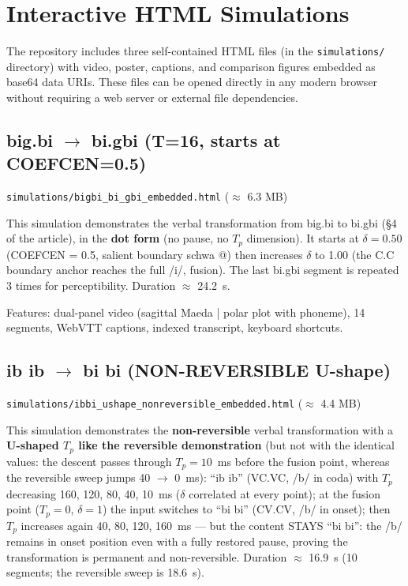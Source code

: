 \documentclass[11pt,a4paper]{article}
\begin{document}
\section{Interactive HTML Simulations}

The repository includes three self-contained HTML files (in the
\texttt{simulations/} directory) with video, poster, captions, and
comparison figures embedded as base64 data URIs. These files can be
opened directly in any modern browser without requiring a web server
or external file dependencies.

\subsection{big.bi $\to$ bi.gbi (T=16, starts at COEFCEN=0.5)}

\texttt{simulations/bigbi\_bi\_gbi\_embedded.html} ($\approx$ 6.3 MB)

This simulation demonstrates the verbal transformation from big.bi
to bi.gbi (\S4 of the article), in the \textbf{dot form} (no pause,
no $T_p$ dimension). It starts at $\delta = 0.50$ (COEFCEN = 0.5,
salient boundary schwa @) then increases $\delta$ to 1.00 (the C.C
boundary anchor reaches the full /i/, fusion). The last bi.gbi
segment is repeated 3 times for perceptibility. Duration
$\approx$ 24.2~s.

Features: dual-panel video (sagittal Maeda | polar plot with phoneme),
14 segments, WebVTT captions, indexed transcript, keyboard shortcuts.

\subsection{ib ib $\to$ bi bi (NON-REVERSIBLE U-shape)}

\texttt{simulations/ibbi\_ushape\_nonreversible\_embedded.html}
($\approx$ 4.4 MB)

This simulation demonstrates the \textbf{non-reversible} verbal
transformation with a \textbf{U-shaped $T_p$ like the reversible
demonstration} (but not with the identical values: the descent passes
through $T_p = 10$~ms before the fusion point, whereas the reversible
sweep jumps 40 $\to$ 0~ms): ``ib ib'' (VC.VC, /b/ in coda) with $T_p$
decreasing 160, 120, 80, 40, 10~ms ($\delta$ correlated at every
point); at the fusion point ($T_p=0$, $\delta=1$) the input switches
to ``bi bi'' (CV.CV, /b/ in onset); then $T_p$ increases again 40, 80,
120, 160~ms --- but the content STAYS ``bi bi'': the /b/ remains in
onset position even with a fully restored pause, proving the
transformation is permanent and non-reversible. Duration
$\approx$ 16.9~s (10 segments; the reversible sweep is 18.6~s).
\end{document}
